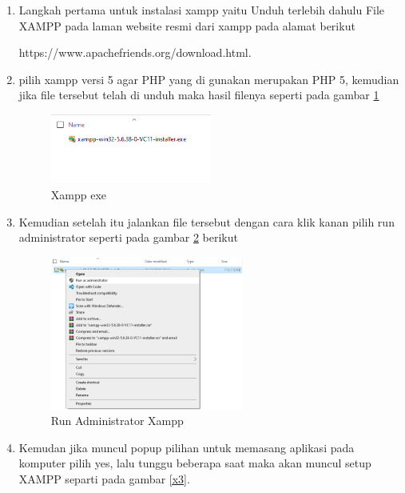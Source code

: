 \begin{enumerate}


\item Langkah pertama untuk instalasi xampp yaitu Unduh terlebih dahulu File XAMPP pada laman website resmi dari xampp pada alamat berikut\par
https://www.apachefriends.org/download.html.

\item pilih xampp versi 5 agar PHP yang di gunakan merupakan PHP 5, kemudian jika file tersebut telah di unduh maka hasil filenya seperti pada gambar \ref{x1}

\begin{figure}[htbp]
	\centerline{\includegraphics[width=0.50\textwidth]{figures/xampp/hasil.png}}
	\caption{Xampp exe}
	\label{x1}
\end{figure}

\item Kemudian setelah itu jalankan file tersebut dengan cara klik kanan pilih run administrator seperti pada gambar \ref{x2} berikut 

\begin{figure}[!htbp]
	\centerline{\includegraphics[width=0.60\textwidth]{figures/xampp/1.png}}
	\caption{Run Administrator Xampp}
	\label{x2}
\end{figure}
\pagebreak

\item Kemudan jika muncul popup pilihan untuk memasang aplikasi pada komputer pilih yes, lalu tunggu beberapa saat maka akan muncul setup XAMPP separti pada gambar \ref{x3}.


\end{enumerate}
